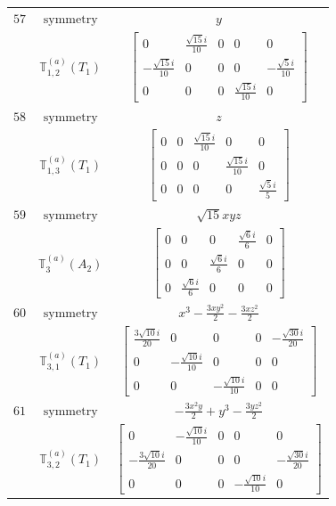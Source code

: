 \documentclass[fleqn,8pt,landscape]{jsarticle}
\begin{document}
\begin{longtable}{ccc}
$ 57 $ & $ \text{symmetry} $ & $ y $ \\
$  $ & $ \mathbb{T}_{1,2}^{(a)}(T_{1}) $ & $ \begin{bmatrix} 0 & \frac{\sqrt{15} i}{10} & 0 & 0 & 0 \\ - \frac{\sqrt{15} i}{10} & 0 & 0 & 0 & - \frac{\sqrt{5} i}{10} \\ 0 & 0 & 0 & \frac{\sqrt{15} i}{10} & 0 \end{bmatrix} $ \\ \hline
$ 58 $ & $ \text{symmetry} $ & $ z $ \\
$  $ & $ \mathbb{T}_{1,3}^{(a)}(T_{1}) $ & $ \begin{bmatrix} 0 & 0 & \frac{\sqrt{15} i}{10} & 0 & 0 \\ 0 & 0 & 0 & \frac{\sqrt{15} i}{10} & 0 \\ 0 & 0 & 0 & 0 & \frac{\sqrt{5} i}{5} \end{bmatrix} $ \\ \hline
$ 59 $ & $ \text{symmetry} $ & $ \sqrt{15} x y z $ \\
$  $ & $ \mathbb{T}_{3}^{(a)}(A_{2}) $ & $ \begin{bmatrix} 0 & 0 & 0 & \frac{\sqrt{6} i}{6} & 0 \\ 0 & 0 & \frac{\sqrt{6} i}{6} & 0 & 0 \\ 0 & \frac{\sqrt{6} i}{6} & 0 & 0 & 0 \end{bmatrix} $ \\ \hline
$ 60 $ & $ \text{symmetry} $ & $ x^{3} - \frac{3 x y^{2}}{2} - \frac{3 x z^{2}}{2} $ \\
$  $ & $ \mathbb{T}_{3,1}^{(a)}(T_{1}) $ & $ \begin{bmatrix} \frac{3 \sqrt{10} i}{20} & 0 & 0 & 0 & - \frac{\sqrt{30} i}{20} \\ 0 & - \frac{\sqrt{10} i}{10} & 0 & 0 & 0 \\ 0 & 0 & - \frac{\sqrt{10} i}{10} & 0 & 0 \end{bmatrix} $ \\ \hline
$ 61 $ & $ \text{symmetry} $ & $ - \frac{3 x^{2} y}{2} + y^{3} - \frac{3 y z^{2}}{2} $ \\
$  $ & $ \mathbb{T}_{3,2}^{(a)}(T_{1}) $ & $ \begin{bmatrix} 0 & - \frac{\sqrt{10} i}{10} & 0 & 0 & 0 \\ - \frac{3 \sqrt{10} i}{20} & 0 & 0 & 0 & - \frac{\sqrt{30} i}{20} \\ 0 & 0 & 0 & - \frac{\sqrt{10} i}{10} & 0 \end{bmatrix} $ \\ \hline

\end{longtable}
\end{document}
